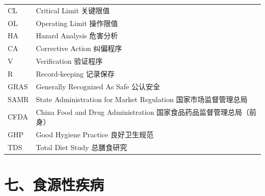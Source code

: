\begin{table}[H]
\begin{tabularx}{\textwidth}{lX}
CL & Critical Limit \hfill 关键限值 \\
OL & Operating Limit \hfill 操作限值 \\
HA & Hazard Analysis \hfill 危害分析 \\
CA & Corrective Action \hfill 纠偏程序 \\
V & Verification \hfill 验证程序 \\
R & Record-keeping \hfill 记录保存 \\
GRAS & Generally Recognized As Safe \hfill 公认安全 \\
SAMR & State Administration for Market Regulation \hfill 国家市场监督管理总局 \\
CFDA & China Food and Drug Administration \hfill 国家食品药品监督管理总局（前身） \\
GHP & Good Hygiene Practice \hfill 良好卫生规范 \\
TDS & Total Diet Study \hfill 总膳食研究 \\
\bottomrule
\end{tabularx}
\end{table}

\section{七、食源性疾病}

